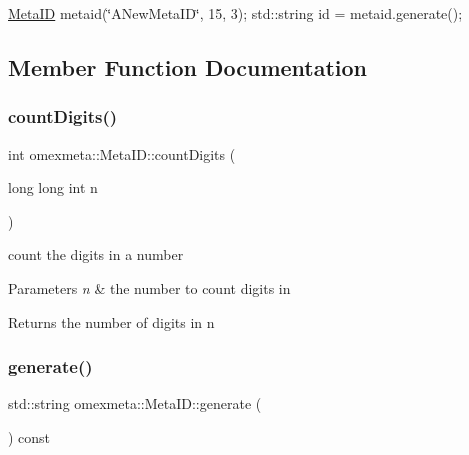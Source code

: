 \hyperlink{classomexmeta_1_1MetaID}{Meta\+ID} metaid(\char`\"{}\+A\+New\+Meta\+I\+D\char`\"{}, 15, 3); std\+::string id = metaid.\+generate(); 

\subsection{Member Function Documentation}
\mbox{\label{classomexmeta_1_1MetaID_ae4fe83a3512f64065e8e2997bc710be6}} 
\subsubsection{\texorpdfstring{count\+Digits()}{countDigits()}}
{\footnotesize\ttfamily int omexmeta\+::\+Meta\+I\+D\+::count\+Digits (\begin{DoxyParamCaption}\item[{long long int}]{n }\end{DoxyParamCaption})\hspace{0.3cm}{\ttfamily [static]}}



count the digits in a number 


\begin{DoxyParams}{Parameters}
{\em n} & the number to count digits in \\
\hline
\end{DoxyParams}
\begin{DoxyReturn}{Returns}
the number of digits in n 
\end{DoxyReturn}
\mbox{\label{classomexmeta_1_1MetaID_a95e709df9b0ee47473bc40012738cdc8}} 
\subsubsection{\texorpdfstring{generate()}{generate()}\hspace{0.1cm}{\footnotesize\ttfamily [1/2]}}
{\footnotesize\ttfamily std\+::string omexmeta\+::\+Meta\+I\+D\+::generate (\begin{DoxyParamCaption}{ }\end{DoxyParamCaption}) const}



